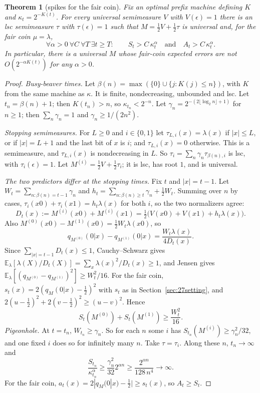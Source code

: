 \documentclass[11pt]{article}
\newcommand{\B}{\{0,1\}}
\newcommand{\eps}{\epsilon}
\newcommand{\E}{\mathbb{E}}
\newtheorem{theorem}{Theorem}[section]
\theoremstyle{definition}
\theoremstyle{remark}
\begin{document}
\begin{theorem}[spikes for the fair coin]\label{thm:spikes}
Fix an optimal prefix machine defining $K$ and $\kappa_t=2^{-K(t)}$. For every
universal semimeasure $V$ with $V(\eps)=1$ there is an lsc semimeasure $\tau$
with $\tau(\eps)=1$ such that $M=\frac12V+\frac12\tau$ is universal and, for the
fair coin $\mu=\lambda$,
\[
\forall\alpha>0\ \forall C\ \forall T\ \exists t\ge T:\qquad
S_t>C\,\kappa_t^{\alpha}\quad\text{and}\quad A_t>C\,\kappa_t^{\alpha}.
\]
In particular, there is a universal $M$ whose fair-coin expected errors are not
$O(2^{-\alpha K(t)})$ for any $\alpha>0$.
\end{theorem}

\begin{proof}
\emph{Busy-beaver times.} Let
$\beta(n)=\max(\{0\}\cup\{j:K(j)\le n\})$, with $K$ from the same machine as
$\kappa$. It is finite, nondecreasing, unbounded and lsc. Let $t_n=\beta(n)+1$;
then $K(t_n)>n$, so $\kappa_{t_n}<2^{-n}$. Let
$\gamma_n=2^{-(2\lfloor\log_2n\rfloor+1)}$ for $n\ge1$; then
$\sum_n\gamma_n=1$ and $\gamma_n\ge1/(2n^2)$.

\emph{Stopping semimeasures.} For $L\ge0$ and $i\in\B$ let
$\tau_{L,i}(x)=\lambda(x)$ if $|x|\le L$, or if $|x|=L+1$ and the last bit of $x$
is $i$; and $\tau_{L,i}(x)=0$ otherwise. This is a semimeasure, and
$\tau_{L,i}(x)$ is nondecreasing in $L$. So
$\tau_i=\sum_n\gamma_n\tau_{\beta(n),i}$ is lsc, with $\tau_i(\eps)=1$. Let
$M^{(i)}=\frac12V+\frac12\tau_i$; it is lsc, has root $1$, and is universal.

\emph{The two predictors differ at the stopping times.} Fix $t$ and $|x|=t-1$.
Let $W_t=\sum_{n:\beta(n)=t-1}\gamma_n$ and
$h_t=\sum_{n:\beta(n)\ge t}\gamma_n+\frac12W_t$. Summing over $n$ by cases,
$\tau_i(x0)+\tau_i(x1)=h_t\lambda(x)$ for both $i$, so the two normalizers agree:
\[
D_t(x):=M^{(i)}(x0)+M^{(i)}(x1)=\tfrac12\bigl(V(x0)+V(x1)+h_t\lambda(x)\bigr).
\]
Also $M^{(0)}(x0)-M^{(1)}(x0)=\frac12W_t\lambda(x0)$, so
\[
q_{M^{(0)}}(0|x)-q_{M^{(1)}}(0|x)=\frac{W_t\lambda(x)}{4D_t(x)} .
\]
Since $\sum_{|x|=t-1}D_t(x)\le1$, Cauchy--Schwarz gives
$\E_\lambda[\lambda(X)/D_t(X)]=\sum_x\lambda(x)^2/D_t(x)\ge1$, and Jensen gives
$\E_\lambda[(q_{M^{(0)}}-q_{M^{(1)}})^2]\ge W_t^2/16$. For the fair coin,
$s_t(x)=2(q_M(0|x)-\frac12)^2$ with $s_t$ as in Section~\ref{sec:27setting}, and $2(u-\frac12)^2+2(v-\frac12)^2\ge(u-v)^2$.
Hence
\[
S_t(M^{(0)})+S_t(M^{(1)})\ge\frac{W_t^2}{16}.
\]
\emph{Pigeonhole.} At $t=t_n$, $W_{t_n}\ge\gamma_n$. So for each $n$ some
$i$ has $S_{t_n}(M^{(i)})\ge\gamma_n^2/32$, and one fixed $i$ does so for
infinitely many $n$. Take $\tau=\tau_i$. Along these $n$, $t_n\to\infty$ and
\[
\frac{S_{t_n}}{\kappa_{t_n}^\alpha}\ge\frac{\gamma_n^2}{32}2^{\alpha n}\ge\frac{2^{\alpha n}}{128\,n^4}\to\infty .
\]
For the fair coin, $a_t(x)=2|q_M(0|x)-\frac12|\ge s_t(x)$, so $A_t\ge S_t$.
\end{proof}
\end{document}
